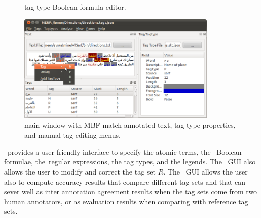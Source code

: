 \begin{figure}[tb!]
  \centering
  {\setlength{\fboxsep}{0pt}%
  \setlength{\fboxrule}{0.5pt}%
  }
  \caption{\framework tag type Boolean formula editor.}
  \label{f:bfe}
\end{figure}

\begin{figure}[tb!]
  \centering
  \includegraphics[width=0.85\textwidth]{figures/mbfmatchvis}
  \caption{\framework main window with MBF match annotated text, tag type properties, and manual tag editing menus.}
  \label{fig:mbftagger}
\end{figure}



\framework~provides a user friendly interface to specify the 
atomic terms, the \framework~Boolean formulae, the~\framework regular expressions, 
the tag types, and the legends. 
The \framework~GUI also allows the user to modify and correct the 
tag set $R$. 
The \framework~GUI allows the user also to compute accuracy results 
that compare different tag sets and that can sever well as 
inter annotation agreement results
when the tag sets come from two human annotators, 
or as evaluation results when comparing with reference tag sets.

